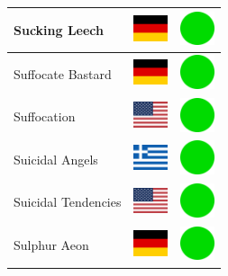 \documentclass[12pt, a4paper, twoside]{report}
\begin{document}
\begin{center}
\begin{longtable}{|p{5cm}|p{2cm}|p{2cm}|}
 Sucking Leech                                              & \includegraphics[width=1cm]{4x3/de} &   \includegraphics[width=1cm]{likes/y} \\ \hline
 Suffocate Bastard                                          & \includegraphics[width=1cm]{4x3/de} &   \includegraphics[width=1cm]{likes/y} \\ \hline
 Suffocation                                                & \includegraphics[width=1cm]{4x3/us} &   \includegraphics[width=1cm]{likes/y} \\ \hline
 Suicidal Angels                                            & \includegraphics[width=1cm]{4x3/gr} &   \includegraphics[width=1cm]{likes/y} \\ \hline
 Suicidal Tendencies                                        & \includegraphics[width=1cm]{4x3/us} &   \includegraphics[width=1cm]{likes/y} \\ \hline
 Sulphur Aeon                                               & \includegraphics[width=1cm]{4x3/de} &   \includegraphics[width=1cm]{likes/y} \\ \hline

\end{longtable}
\end{center}
\end{document}
